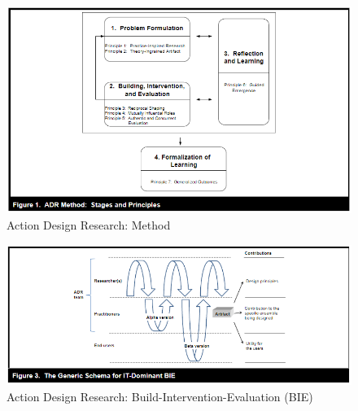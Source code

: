 \documentclass[11pt,a4paper]{scrbook}
\begin{document}
\begin{figure}[!ht]
  \includegraphics[width=\linewidth]{Figures/Paper_2011_ActionDesignResearch_Method.PNG}
  \caption{Action Design Research: Method}
  \label{fig:Sein:2011:ADR:Method}
\end{figure}

\begin{figure}[!ht]
  \includegraphics[width=\linewidth]{Figures/Paper_2011_ActionDesignResearch_BIE.PNG}
  \caption{Action Design Research: Build-Intervention-Evaluation (BIE)}
  \label{fig:Sein:2011:ADR:BIE}
\end{figure}





\backmatter

\thispagestyle{empty}

\vspace*{\fill}
\pagestyle{empty}
\end{document}
